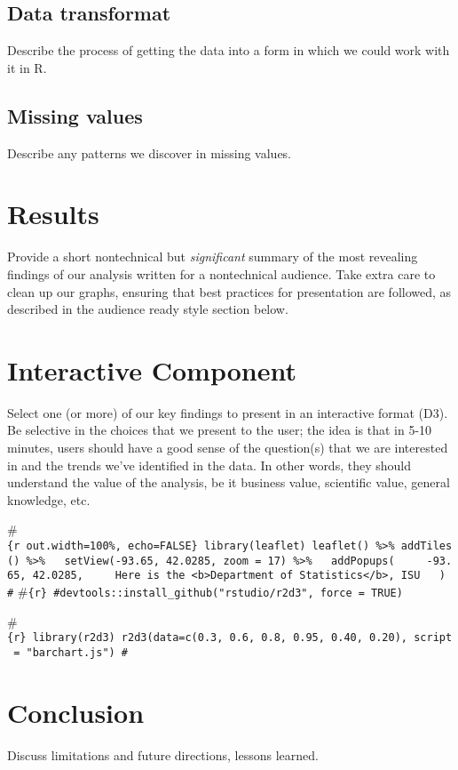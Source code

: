 \documentclass[]{book}
\begin{document}
\hypertarget{data-transformat}{%
\section{Data transformat}\label{data-transformat}}

Describe the process of getting the data into a form in which we could work with it in R.

\hypertarget{missing-values}{%
\section{Missing values}\label{missing-values}}

Describe any patterns we discover in missing values.

\hypertarget{results}{%
\chapter{Results}\label{results}}

Provide a short nontechnical but \emph{significant} summary of the most revealing findings of our analysis written for a nontechnical audience. Take extra care to clean up our graphs, ensuring that best practices for presentation are followed, as described in the audience ready style section below.

\hypertarget{interactive-component}{%
\chapter{Interactive Component}\label{interactive-component}}

Select one (or more) of our key findings to present in an interactive format (D3). Be selective in the choices that we present to the user; the idea is that in 5-10 minutes, users should have a good sense of the question(s) that we are interested in and the trends we've identified in the data. In other words, they should understand the value of the analysis, be it business value, scientific value, general knowledge, etc.

\#\texttt{\{r\ out.width=\textquotesingle{}100\%\textquotesingle{},\ echo=FALSE\}\ library(leaflet)\ leaflet()\ \%\textgreater{}\%\ addTiles()\ \%\textgreater{}\%\ \ \ setView(-93.65,\ 42.0285,\ zoom\ =\ 17)\ \%\textgreater{}\%\ \ \ addPopups(\ \ \ \ \ -93.65,\ 42.0285,\ \ \ \ \ \textquotesingle{}Here\ is\ the\ \textless{}b\textgreater{}Department\ of\ Statistics\textless{}/b\textgreater{},\ ISU\textquotesingle{}\ \ \ )\ \#}
\#\texttt{\{r\}\ \#devtools::install\_github("rstudio/r2d3",\ force\ =\ TRUE)}

\#\texttt{\{r\}\ library(r2d3)\ r2d3(data=c(0.3,\ 0.6,\ 0.8,\ 0.95,\ 0.40,\ 0.20),\ script\ =\ "barchart.js")\ \#}

\hypertarget{conclusion}{%
\chapter{Conclusion}\label{conclusion}}

Discuss limitations and future directions, lessons learned.


\end{document}
